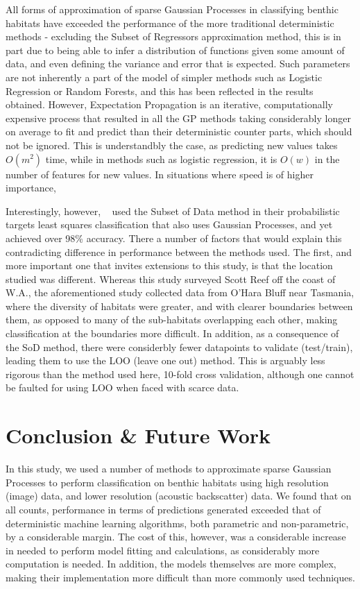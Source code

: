 \documentclass[10pt,sts]{article}
\begin{document}
\begin{multicols}{2}
All forms of approximation of sparse Gaussian Processes in classifying benthic habitats have exceeded the performance of the more traditional deterministic methods - excluding the Subset of Regressors approximation method, this is in part due to being able to infer a distribution of functions given some amount of data, and even defining the variance and error that is expected. Such parameters are not inherently a part of the model of simpler methods such as Logistic Regression or Random Forests, and this has been reflected in the results obtained. However, Expectation Propagation is an iterative, computationally expensive process that resulted in all the GP methods taking considerably longer on average to fit and predict than their deterministic counter parts, which should not be ignored. This is understandbly the case, as predicting new values takes $O(m^2)$ time, while in methods such as logistic regression, it is $O(w)$ in the number of features for new values. In situations where speed is of higher importance, 

Interestingly, however, ~\citet{bender12} used the Subset of Data method in their probabilistic targets least squares classification that also uses Gaussian Processes, and yet achieved over 98\% accuracy. There a number of factors that would explain this contradicting difference in performance between the methods used. The first, and more important one that invites extensions to this study, is that the location studied was different. Whereas this study surveyed Scott Reef off the coast of W.A., the aforementioned study collected data from O'Hara Bluff near Tasmania, where the diversity of habitats were greater, and with clearer boundaries between them, as opposed to many of the sub-habitats overlapping each other, making classification at the boundaries more difficult. In addition, as a consequence of the SoD method, there were considerbly fewer datapoints to validate (test/train), leading them to use the LOO (leave one out) method. This is arguably less rigorous than the method used here, 10-fold cross validation, although one cannot be faulted for using LOO when faced with scarce data.

\section{Conclusion \& Future Work}

In this study, we used a number of methods to approximate sparse Gaussian Processes to perform classification on benthic habitats using high resolution (image) data, and lower resolution (acoustic backscatter) data. We found that on all counts, performance in terms of predictions generated exceeded that of deterministic machine learning algorithms, both parametric and non-parametric, by a considerable margin. The cost of this, however, was a considerable increase in needed to perform model fitting and calculations, as considerably more computation is needed. In addition, the models themselves are more complex, making their implementation more difficult than more commonly used techniques.


\end{multicols}
\end{document}
